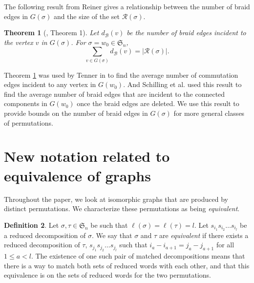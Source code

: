 \documentclass[11pt,reqno]{amsart}
\newtheorem{theorem}{Theorem}[section]
\theoremstyle{definition}
\newtheorem{definition}[theorem]{Definition}
\theoremstyle{notation}
\newcommand{\calR}{\mathcal{R}}
\newcommand{\calB}{\mathcal{B}}
\newcommand{\JEem}{\textit}
\begin{document}
The following result from Reiner gives a relationship between the number of braid edges in $G(\sigma)$ and the size of the set $\calR(\sigma)$.

\begin{theorem}[\cite{R}, Theorem 1]\label{ReinerBraid}
Let $d_\calB(v)$ be the number of braid edges incident to the vertex $v$ in $G(\sigma)$. For $\sigma =w_0\in \mathfrak{S}_n$,
\[
\sum_{v\in G(\sigma)}d_\calB(v) = |\calR(\sigma)|.
\]
\end{theorem}

Theorem \ref{ReinerBraid} was used by Tenner in \cite{T2} to find the average number of commutation edges incident to any vertex in $G(w_0)$. And Schilling et al. \cite{Sch} used this result to find the average number of braid edges that are incident to the connected components in $G(w_0)$ once the braid edges are deleted. We use this result to provide bounds on the number of braid edges in $G(\sigma)$ for more general classes of permutations.

\section{New notation related to equivalence of graphs}\label{sec:notation}

Throughout the paper, we look at isomorphic graphs that are produced by distinct permutations. We characterize these permutations as being \JEem{equivalent}. 

\begin{definition}
Let $\sigma, \tau \in 
\mathfrak{S}_n$ be such that $\ell(\sigma)=\ell(\tau)=l$. Let $s_{i_1}s_{i_2}\ldots s_{i_l}$ be a reduced decomposition of $\sigma$. We say that $\sigma$ and $\tau$ are \JEem{equivalent} if there exists a reduced decomposition of $\tau$, $s_{j_1}s_{j_2}\ldots s_{j_l}$ such that $i_a-i_{a+1} = j_a-j_{a+1}$ for all $1\leq a<l$. The existence of one such pair of matched decompositions means that there is a way to match both sets of reduced words with each other, and that this equivalence is on the sets of reduced words for the two permutations.
\end{definition}
\end{document}
